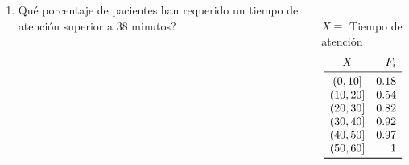 \documentclass[aspectratio=149,10pt,t]{beamer}
\begin{document}
\begin{frame}
	\begin{columns}
		\begin{column}[T]{0.7\textwidth}
			\begin{enumerate}
			  \item[3.] Qué porcentaje de pacientes han requerido un tiempo de atención superior a 38 minutos?
			\end{enumerate}
		\end{column}
		\begin{column}[T]{0.3\textwidth}
			\\
			$X\equiv$ Tiempo de atención\\
			\[
			\begin{array}{cr}
				X & F_i\\
				\midrule
				(0,10] & 0.18\\
				(10,20] & 0.54\\
				(20,30] & 0.82\\
				(30,40] & 0.92\\
				(40,50] & 0.97\\
				(50,60] & 1\\
				\bottomrule
			\end{array}
			\]
		\end{column}
	\end{columns}
\end{frame}
\end{document}

